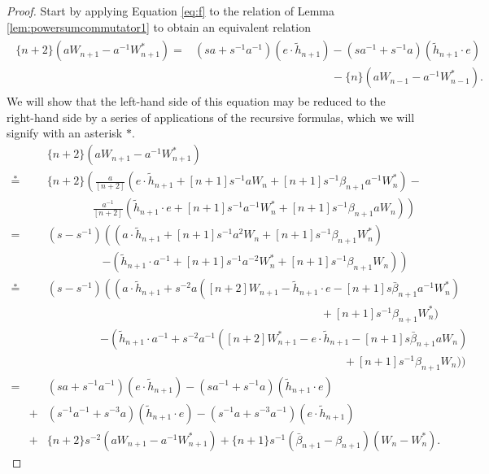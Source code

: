 \begin{proof}
Start by applying Equation \eqref{eq:f} to the relation of Lemma \ref{lem:powersumcommutator1} to obtain an equivalent relation
\begin{align}\label{eq_perprel4}
\begin{split}
\{n+2\} \left( aW_{n+1} - a^{-1}W^*_{n+1} \right) =& \left( sa+s^{-1}a^{-1} \right) \left( e \cdot \tilde{h}_{n+1} \right) - \left( sa^{-1}+s^{-1}a \right) \left( \tilde{h}_{n+1} \cdot e \right) \\
 & \qquad\qquad\qquad\qquad\qquad\qquad - \{n\}\left( aW_{n-1}-a^{-1}W^*_{n-1} \right).
\end{split}
\end{align}
We will show that the left-hand side of this equation may be reduced to the right-hand side by a series of applications of the recursive formulas, which we will signify with an asterisk $\ast$. 
\begin{eqnarray*}
&& \{n+2\} \left( aW_{n+1} - a^{-1}W^*_{n+1} \right) \\
\overset{\ast}{=}&& \{n+2\} \left( \frac{a}{[n+2]} \left( e \cdot \tilde{h}_{n+1} + [n+1]s^{-1}aW_n + [n+1]s^{-1}\beta_{n+1}a^{-1}W^*_n \right) \right.- \\
&&\left.\qquad\qquad\frac{a^{-1}}{[n+2]} \left( \tilde{h}_{n+1} \cdot e + [n+1]s^{-1}a^{-1}W^*_n + [n+1]s^{-1}\beta_{n+1}aW_n \right) \right)  \\
=&& \left( s - s^{-1} \right) \left( \left( a \cdot \tilde{h}_{n+1} + [n+1]s^{-1}a^2W_n + [n+1]s^{-1}\beta_{n+1}W^*_n \right) \right. \\
&&\qquad\qquad\,\,\,\,\,\left.-\left( \tilde{h}_{n+1} \cdot a^{-1} + [n+1]s^{-1}a^{-2}W^*_n + [n+1]s^{-1}\beta_{n+1}W_n \right)\right) \\
\overset{\ast}{=}&&\left( s-s^{-1} \right) \left( \left( a \cdot \tilde{h}_{n+1} + s^{-2}a \left( [n+2]W_{n+1} - \tilde{h}_{n+1} \cdot e - [n+1]s\bar{\beta}_{n+1}a^{-1}W^*_n \right) \right. \right. \\
&&\qquad\qquad\qquad\qquad\qquad\qquad\qquad\qquad\qquad\qquad\qquad\qquad
+ [n+1]s^{-1}\beta_{n+1}W^*_n \Big)  \\
&&\qquad\qquad\,\,\,\, \left. - \left( \tilde{h}_{n+1} \cdot a^{-1} + s^{-2}a^{-1}\left( [n+2]W^*_{n+1} - e \cdot \tilde{h}_{n+1} - [n+1]s\bar{\beta}_{n+1}aW_n \right) \right. \right. \\
&&\qquad\qquad\qquad\qquad\qquad\qquad\qquad\qquad\qquad\qquad\qquad\qquad\quad\quad
+ [n+1]s^{-1}\beta_{n+1}W_n \Big) \Big) \\
=&&\left( sa + s^{-1}a^{-1} \right) \left( e \cdot \tilde{h}_{n+1} \right) - \left( sa^{-1} + s^{-1}a \right) \left( \tilde{h}_{n+1} \cdot e \right) \\
&+& \left( s^{-1}a^{-1} + s^{-3}a \right) \left( \tilde{h}_{n+1} \cdot e \right) - \left( s^{-1}a + s^{-3}a^{-1} \right) \left( e \cdot \tilde{h}_{n+1} \right) \\
&+& \{n+2\}s^{-2}\left( aW_{n+1} - a^{-1} W^*_{n+1} \right) + \{n+1\}s^{-1}\left( \bar{\beta}_{n+1} - \beta_{n+1} \right) \left( W_n - W^*_n \right).
\end{eqnarray*}


\end{proof}

